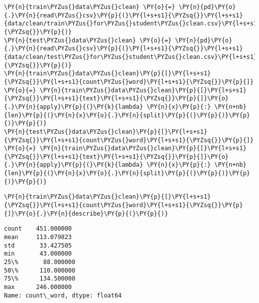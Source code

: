\documentclass[../main.tex]{subfiles}
\begin{document}
    \begin{tcolorbox}[breakable, size=fbox, boxrule=1pt, pad at break*=1mm,colback=cellbackground, colframe=cellborder]
\begin{Verbatim}[commandchars=\\\{\}]
\PY{n}{train\PYZus{}data\PYZus{}clean} \PY{o}{=} \PY{n}{pd}\PY{o}{.}\PY{n}{read\PYZus{}csv}\PY{p}{(}\PY{l+s+s1}{\PYZsq{}}\PY{l+s+s1}{data/clean/train\PYZus{}for\PYZus{}student\PYZus{}clean.csv}\PY{l+s+s1}{\PYZsq{}}\PY{p}{)}
\PY{n}{test\PYZus{}data\PYZus{}clean} \PY{o}{=} \PY{n}{pd}\PY{o}{.}\PY{n}{read\PYZus{}csv}\PY{p}{(}\PY{l+s+s1}{\PYZsq{}}\PY{l+s+s1}{data/clean/test\PYZus{}for\PYZus{}student\PYZus{}clean.csv}\PY{l+s+s1}{\PYZsq{}}\PY{p}{)}
\PY{n}{train\PYZus{}data\PYZus{}clean}\PY{p}{[}\PY{l+s+s1}{\PYZsq{}}\PY{l+s+s1}{count\PYZus{}word}\PY{l+s+s1}{\PYZsq{}}\PY{p}{]} \PY{o}{=} \PY{n}{train\PYZus{}data\PYZus{}clean}\PY{p}{[}\PY{l+s+s1}{\PYZsq{}}\PY{l+s+s1}{text}\PY{l+s+s1}{\PYZsq{}}\PY{p}{]}\PY{o}{.}\PY{n}{apply}\PY{p}{(}\PY{k}{lambda} \PY{n}{x}\PY{p}{:} \PY{n+nb}{len}\PY{p}{(}\PY{n}{x}\PY{o}{.}\PY{n}{split}\PY{p}{(}\PY{p}{)}\PY{p}{)}\PY{p}{)}
\PY{n}{test\PYZus{}data\PYZus{}clean}\PY{p}{[}\PY{l+s+s1}{\PYZsq{}}\PY{l+s+s1}{count\PYZus{}word}\PY{l+s+s1}{\PYZsq{}}\PY{p}{]} \PY{o}{=} \PY{n}{train\PYZus{}data\PYZus{}clean}\PY{p}{[}\PY{l+s+s1}{\PYZsq{}}\PY{l+s+s1}{text}\PY{l+s+s1}{\PYZsq{}}\PY{p}{]}\PY{o}{.}\PY{n}{apply}\PY{p}{(}\PY{k}{lambda} \PY{n}{x}\PY{p}{:} \PY{n+nb}{len}\PY{p}{(}\PY{n}{x}\PY{o}{.}\PY{n}{split}\PY{p}{(}\PY{p}{)}\PY{p}{)}\PY{p}{)}
\end{Verbatim}
\end{tcolorbox}

    \begin{tcolorbox}[breakable, size=fbox, boxrule=1pt, pad at break*=1mm,colback=cellbackground, colframe=cellborder]
\begin{Verbatim}[commandchars=\\\{\}]
\PY{n}{train\PYZus{}data\PYZus{}clean}\PY{p}{[}\PY{l+s+s1}{\PYZsq{}}\PY{l+s+s1}{count\PYZus{}word}\PY{l+s+s1}{\PYZsq{}}\PY{p}{]}\PY{o}{.}\PY{n}{describe}\PY{p}{(}\PY{p}{)}
\end{Verbatim}
\end{tcolorbox}

            \begin{tcolorbox}[breakable, size=fbox, boxrule=.5pt, pad at break*=1mm, opacityfill=0]
\begin{Verbatim}[commandchars=\\\{\}]
count    451.000000
mean     113.079823
std       33.427505
min       43.000000
25\%       88.000000
50\%      110.000000
75\%      134.500000
max      246.000000
Name: count\_word, dtype: float64
\end{Verbatim}
\end{tcolorbox}
        
\end{document}
